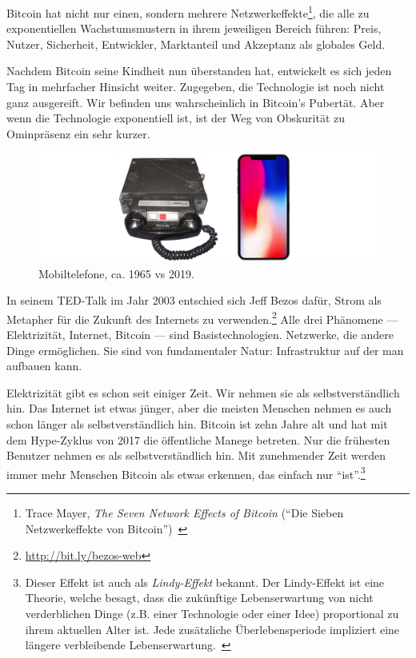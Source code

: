 Bitcoin hat nicht nur einen, sondern mehrere Netzwerkeffekte\footnote{Trace
Mayer, \textit{The Seven Network Effects of Bitcoin} (\enquote{Die Sieben
Netzwerkeffekte von Bitcoin})~\cite{7-network-effects}}, die alle zu
exponentiellen Wachstumsmustern in ihrem jeweiligen Bereich führen: Preis,
Nutzer, Sicherheit, Entwickler, Marktanteil und Akzeptanz als globales Geld.

Nachdem Bitcoin seine Kindheit nun überstanden hat, entwickelt es sich jeden Tag
in mehrfacher Hinsicht weiter. Zugegeben, die Technologie ist noch nicht ganz
ausgereift. Wir befinden uns wahrscheinlich in Bitcoin's Pubertät. Aber wenn die
Technologie exponentiell ist, ist der Weg von Obskurität zu Ominpräsenz ein sehr
kurzer.

\begin{figure}
  \includegraphics{assets/images/mobile-phone.png}
  \caption{Mobiltelefone, ca. 1965 vs 2019.}
  \label{fig:mobile-phone}
\end{figure}

In seinem TED-Talk im Jahr 2003 entschied sich Jeff Bezos dafür, Strom als
Metapher für die Zukunft des Internets zu
verwenden.\footnote{\url{http://bit.ly/bezos-web}} Alle drei Phänomene ---
Elektrizität, Internet, Bitcoin --- sind Basistechnologien. Netzwerke, die
andere Dinge ermöglichen. Sie sind von fundamentaler Natur: Infrastruktur auf
der man aufbauen kann.

Elektrizität gibt es schon seit einiger Zeit. Wir nehmen sie als
selbstverständlich hin. Das Internet ist etwas jünger, aber die meisten Menschen
nehmen es auch schon länger als selbstverständlich hin. Bitcoin ist zehn Jahre
alt und hat mit dem Hype-Zyklus von 2017 die öffentliche Manege betreten. Nur
die frühesten Benutzer nehmen es als selbstverständlich hin. Mit zunehmender
Zeit werden immer mehr Menschen Bitcoin als etwas erkennen, das einfach nur
\enquote{ist}.\footnote{Dieser Effekt ist auch als \textit{Lindy-Effekt}
bekannt. Der Lindy-Effekt ist eine Theorie, welche besagt, dass die zukünftige
Lebenserwartung von nicht verderblichen Dinge (z.B. einer Technologie oder einer
Idee) proportional zu ihrem aktuellen Alter ist. Jede zusätzliche
Überlebensperiode impliziert eine längere verbleibende
Lebenserwartung.~\cite{wiki:lindy}}

